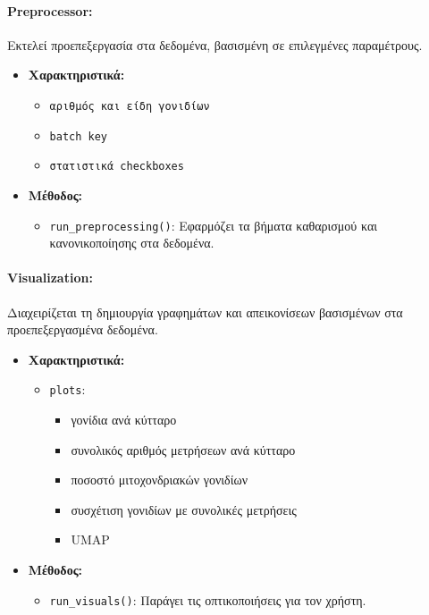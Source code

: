\documentclass{article}  %
\begin{document}
\paragraph{Preprocessor:}
Εκτελεί προεπεξεργασία στα δεδομένα, βασισμένη σε επιλεγμένες παραμέτρους.
\begin{itemize}
  \item \textbf{Χαρακτηριστικά:}
  \begin{itemize}
    \item \texttt{αριθμός και είδη γονιδίων}
    \item \texttt{batch key}
    \item \texttt{στατιστικά checkboxes}
  \end{itemize}
  \item \textbf{Μέθοδος:}
  \begin{itemize}
    \item \texttt{run\_preprocessing()}: Εφαρμόζει τα βήματα καθαρισμού και κανονικοποίησης στα δεδομένα.
  \end{itemize}
\end{itemize}

\paragraph{Visualization:}
Διαχειρίζεται τη δημιουργία γραφημάτων και απεικονίσεων βασισμένων στα προεπεξεργασμένα δεδομένα.
\begin{itemize}
  \item \textbf{Χαρακτηριστικά:}
  \begin{itemize}
    \item \texttt{plots}:
    \begin{itemize}
      \item γονίδια ανά κύτταρο
      \item συνολικός αριθμός μετρήσεων ανά κύτταρο
      \item ποσοστό μιτοχονδριακών γονιδίων
      \item συσχέτιση γονιδίων με συνολικές μετρήσεις
      \item UMAP
    \end{itemize}
  \end{itemize}
  \item \textbf{Μέθοδος:}
  \begin{itemize}
    \item \texttt{run\_visuals()}: Παράγει τις οπτικοποιήσεις για τον χρήστη.
  \end{itemize}
\end{itemize}
\end{document}
